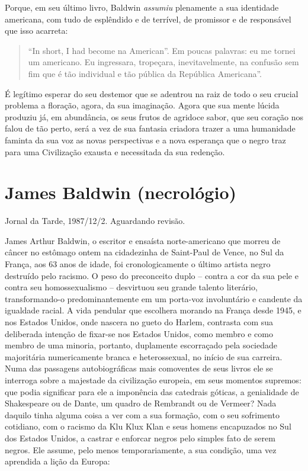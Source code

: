 \documentclass[
  letterpaper,
  DIV=11,
  numbers=noendperiod]{scrreprt}
\begin{document}
Porque, em seu último livro, Baldwin \emph{assumiu} plenamente a sua
identidade americana, com tudo de esplêndido e de terrível, de promissor
e de responsável que isso acarreta:

\begin{quote}
``In short, I had become na American''. Em poucas palavras: eu me tornei
um americano. Eu ingressara, tropeçara, inevitavelmente, na confusão sem
fim que é tão individual e tão pública da República Americana''.
\end{quote}

É legítimo esperar do seu destemor que se adentrou na raiz de todo o seu
crucial problema a floração, agora, da sua imaginação. Agora que sua
mente lúcida produziu já, em abundância, os seus frutos de agridoce
sabor, que seu coração nos falou de tão perto, será a vez de sua
fantasia criadora trazer a uma humanidade faminta da sua voz as novas
perspectivas e a nova esperança que o negro traz para uma Civilização
exausta e necessitada da sua redenção.

\chapter{James Baldwin (necrológio)}\label{james-baldwin-necroluxf3gio}

Jornal da Tarde, 1987/12/2. Aguardando revisão.

\hfill\break

James Arthur Baldwin, o escritor e ensaísta norte-americano que morreu
de câncer no estômago ontem na cidadezinha de Saint-Paul de Vence, no
Sul da França, aos 63 anos de idade, foi cronologicamente o último
artista negro destruído pelo racismo. O peso do preconceito duplo --
contra a cor da sua pele e contra seu homossexualismo -- desvirtuou seu
grande talento literário, transformando-o predominantemente em um
porta-voz involuntário e candente da igualdade racial. A vida pendular
que escolhera morando na França desde 1945, e nos Estados Unidos, onde
nascera no gueto do Harlem, contrasta com sua deliberada intenção de
fixar-se nos Estados Unidos, como membro e como membro de uma minoria,
portanto, duplamente escorraçado pela sociedade majoritária
numericamente branca e heterossexual, no início de sua carreira. Numa
das passagens autobiográficas mais comoventes de seus livros ele se
interroga sobre a majestade da civilização europeia, em seus momentos
supremos: que podia significar para ele a imponência das catedrais
góticas, a genialidade de Shakespeare ou de Dante, um quadro de
Rembrandt ou de Vermeer? Nada daquilo tinha alguma coisa a ver com a sua
formação, com o seu sofrimento cotidiano, com o racismo da Klu Klux Klan
e seus homens encapuzados no Sul dos Estados Unidos, a castrar e
enforcar negros pelo simples fato de serem negros. Ele assume, pelo
menos temporariamente, a sua condição, uma vez aprendida a lição da
Europa:
\end{document}
